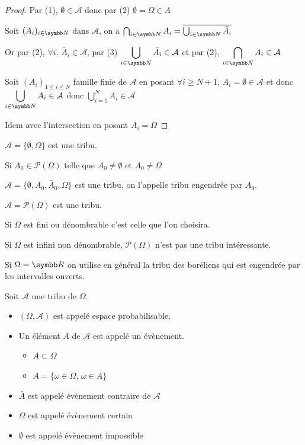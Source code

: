 \begin{proof}
    Par (1), $\emptyset \in \mathcal A$ donc par (2) $\bar \emptyset = \Omega \in A$

    \avspace Soit $(A_i)_{i \in \N}$ dans $\displaystyle \mathcal A$, on a $\bigcap_{i \in \N} A_i = \overline{\bigcup_{i \in \N} \bar A_i}$

    Or par (2), $\forall i, \, \bar A_i \in \mathcal A$, par (3) $\displaystyle \bigcup_{i \in \N} \bar A_i \in \mathcal A$
    et par (2), $\displaystyle \bigcap_{i \in \N} A_i \in \mathcal A$

    \avspace Soit $\displaystyle (A_i)_{1 \leqslant i \leqslant N}$ famille finie de $\mathcal A$ en posant 
    $\forall i \geqslant N+ 1 $, $A_i = \emptyset \in \mathcal A$ et donc $\displaystyle \bigcup_{i \in \N} A_i \in \mathcal A$
    donc $\displaystyle \bigcup_{i = 1}^N A_i \in \mathcal A$

    \avspace Idem avec l'intersection en posant $A_i = \Omega$
\end{proof}


\begin{exemple}
    $\mathcal A = \{\emptyset, \Omega\}$ est une tribu. 

    \avspace Si $A_0 \in \mathscr P(\Omega)$ telle que $A_0 \neq \emptyset$ et $A_0 \neq \Omega$

    \avspace $\mathcal A = \{\emptyset, A_0, \bar A_0, \Omega\}$ est une tribu, on l'appelle tribu 
    engendrée par $A_0$. 

    \avspace $\mathcal A = \mathscr P(\Omega)$ est une tribu. 

    Si $\Omega$ est fini ou dénombrable c'est celle que l'on choisira. 

    Si $\Omega$ est infini non dénombrable, $\mathscr P(\Omega)$ n'est pas une tribu intéressante. 

    Si $\Omega = \R$ on utilise en général la tribu des boréliens qui est engendrée par les intervalles ouverts. 
\end{exemple}

\begin{definition}{}{}
    Soit $\mathcal A$ une tribu de $\Omega$. 
    \begin{itemize}
        \item $(\Omega, \mathcal A)$ est appelé espace probabilisable. 
        \item Un élément $A$ de $\mathcal A$ est appelé un évènement. 
        \begin{itemize}
            \item $A \subset \Omega$
            \item $A = \{ \omega \in \Omega, \, \omega \in A\}$
        \end{itemize}
        \item $\bar A$ est appelé évènement contraire de $\mathcal A$
        \item $\Omega$ est appelé évènement certain
        \item $\emptyset$ est appelé évènement impossible
    \end{itemize}
\end{definition}

